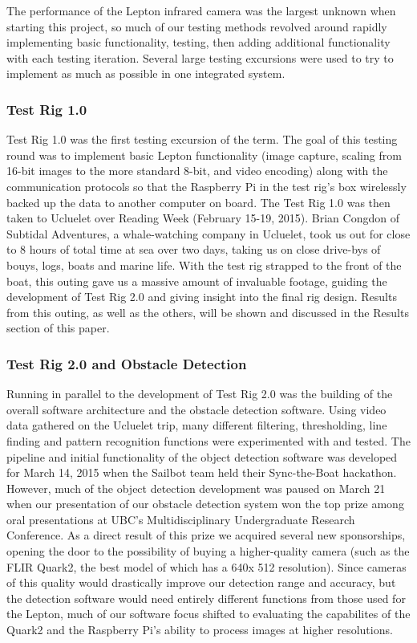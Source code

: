 The performance of the Lepton infrared camera was the largest unknown when starting this project, so much of our testing methods revolved around rapidly implementing basic functionality, testing, then adding additional functionality with each testing iteration. Several large testing excursions were used to try to implement as much as possible in one integrated system.


\subsubsection{\label{sec:discussion:testing:testrig1}Test Rig 1.0}

Test Rig 1.0 was the first testing excursion of the term. The goal of this testing round was to implement basic Lepton functionality (image capture, scaling from 16-bit images to the more standard 8-bit, and video encoding) along with the communication protocols so that the Raspberry Pi in the test rig's box wirelessly backed up the data to another computer on board. The Test Rig 1.0 was then taken to Ucluelet over Reading Week (February 15-19, 2015). Brian Congdon of Subtidal Adventures, a whale-watching company in Ucluelet, took us out for close to 8 hours of total time at sea over two days, taking us on close drive-bys of bouys, logs, boats and marine life. With the test rig strapped to the front of the boat, this outing gave us a massive amount of invaluable footage, guiding the development of Test Rig 2.0 and giving insight into the final rig design. Results from this outing, as well as the others, will be shown and discussed in the Results section of this paper.


\subsubsection{\label{sec:discussion:testing:testrig2}Test Rig 2.0 and Obstacle Detection}

Running in parallel to the development of Test Rig 2.0 was the building of the overall software architecture and the obstacle detection software. Using video data gathered on the Ucluelet trip, many different filtering, thresholding, line finding and pattern recognition functions were experimented with and tested. The pipeline and initial functionality of the object detection software was developed for March 14, 2015 when the Sailbot team held their Sync-the-Boat hackathon. However, much of the object detection development was paused on March 21 when our presentation of our obstacle detection system won the top prize among oral presentations at UBC's Multidisciplinary Undergraduate Research Conference. As a direct result of this prize we acquired several new sponsorships, opening the door to the possibility of buying a higher-quality camera (such as the FLIR Quark2, the best model of which has a 640x 512 resolution). Since cameras of this quality would drastically improve our detection range and accuracy, but the detection software would need entirely different functions from those used for the Lepton, much of our software focus shifted to evaluating the capabilites of the Quark2 and the Raspberry Pi's ability to process images at higher resolutions.


